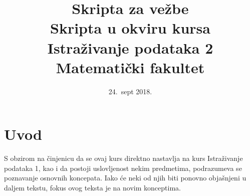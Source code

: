 \documentclass[a4paper]{article}
\begin{document}
\title{Skripta za vežbe\\ \small{Skripta u okviru kursa\\Istraživanje podataka 2\\ Matematički fakultet}}

\date{24.~sept 2018.}
\maketitle


\tableofcontents

\newpage

\section{Uvod}
\label{sec:uvod}

S obzirom na činjenicu da se ovaj kurs direktno nastavlja na kurs Istraživanje podataka 1, kao i da postoji uslovljenost nekim predmetima, podrazumeva se poznavanje osnovnih koncepata. Iako će neki od njih biti ponovno objašnjeni u daljem tekstu, fokus ovog teksta je na novim konceptima. 
\end{document}
